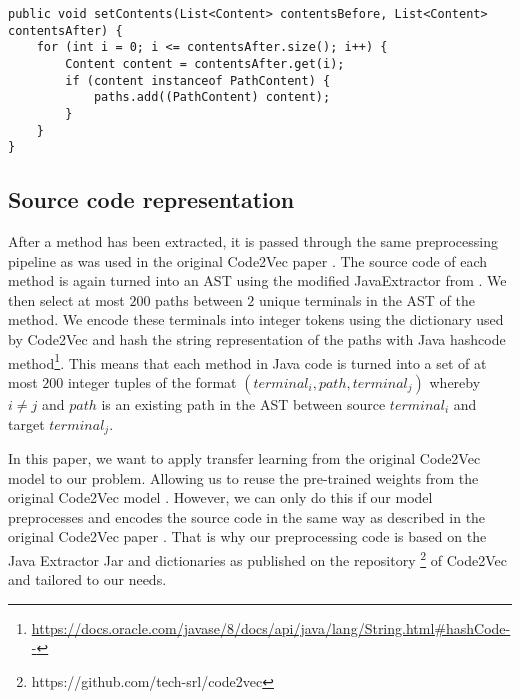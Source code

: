 \begin{lstlisting}[caption={An example of a method after mutation. The context type of this comparator is FORlessEqueals},captionpos=b]
public void setContents(List<Content> contentsBefore, List<Content> contentsAfter) {
    for (int i = 0; i <= contentsAfter.size(); i++) {
        Content content = contentsAfter.get(i);
        if (content instanceof PathContent) {
            paths.add((PathContent) content);
        }
    }
}
\end{lstlisting}


\subsection{Source code representation} \label{sec:SourceCodeRepresentation}
After a method has been extracted, it is passed through the same preprocessing pipeline as was used in the original Code2Vec paper \cite{alon2019code2vec}. The source code of each method is again turned into an AST using the modified JavaExtractor from \cite{alon2019code2vec}. We then select at most $200$ paths between $2$ unique terminals in the AST of the method. We encode these terminals into integer tokens using the dictionary used by Code2Vec \cite{alon2019code2vec} and hash the string representation of the paths with Java hashcode method\footnote{\url{https://docs.oracle.com/javase/8/docs/api/java/lang/String.html#hashCode--}}. This means that each method in Java code is turned into a set of at most $200$ integer tuples of the format $(terminal_i, path, terminal_j)$ whereby $i \neq j$ and $path$ is an existing path in the AST between source $terminal_i$ and target $terminal_j$. 

In this paper, we want to apply transfer learning from the original Code2Vec model \cite{alon2019code2vec} to our problem. Allowing us to reuse the pre-trained weights from the original Code2Vec model \cite{alon2019code2vec}. However, we can only do this if our model preprocesses and encodes the source code in the same way as described in the original Code2Vec paper \cite{alon2019code2vec}. That is why our preprocessing code is based on the Java Extractor Jar and dictionaries as published on the repository \footnote{https://github.com/tech-srl/code2vec} of Code2Vec and tailored to our needs.